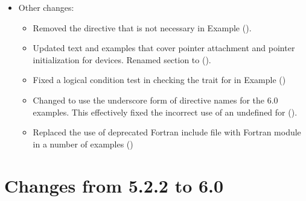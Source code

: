\begin{itemize}
\item Other changes:
\begin{itemize}
  \item Removed the  directive that is not necessary
    in Example  ().
  \item Updated text and examples that cover pointer attachment and pointer
    initialization for devices. Renamed  section
    to 
    ().
  \item Fixed a logical condition test in checking the  trait
    for  in Example 
    ()
  \item Changed to use the underscore form of directive names for the 6.0
    examples. This effectively fixed the incorrect use of an undefined 
     for 
    ().
  \item Replaced the use of deprecated Fortran include file 
    with Fortran module  in a number of examples
    ()
\end{itemize}

\end{itemize}

\section{Changes from 5.2.2 to 6.0}
\label{sec:history_522_to_60}

